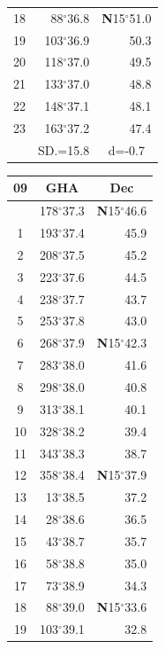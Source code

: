 \documentclass[10pt, a4paper]{report}
\begin{document}
\begin{scriptsize}
\begin{tabular*}{0.2\textwidth}[t]{@{\extracolsep{\fill}}|c|rr|}
18 & 88$^\circ$36.8 & \textbf{N}15$^\circ$51.0\\
19 & 103$^\circ$36.9 & 50.3\\
20 & 118$^\circ$37.0 & 49.5\\
21 & 133$^\circ$37.0 & \raisebox{0.24ex}{\boldmath$\cdot$~\boldmath$\cdot$~~}48.8\\
22 & 148$^\circ$37.1 & 48.1\\
23 & 163$^\circ$37.2 & 47.4\\
\hline
\rule{0pt}{2.4ex} & \multicolumn{1}{c}{SD.=15.8} & \multicolumn{1}{c|}{d=-0.7}\\
\hline
\end{tabular*}\noindent
\begin{tabular*}{0.2\textwidth}[t]{@{\extracolsep{\fill}}|c|rr|}
\hline
\multicolumn{1}{|c|}{\rule{0pt}{2.6ex}\textbf{09}} & \multicolumn{1}{c}{\textbf{GHA}} & \multicolumn{1}{c|}{\textbf{Dec}}\\
\hline\rule{0pt}{2.6ex}\noindent
0 & 178$^\circ$37.3 & \textbf{N}15$^\circ$46.6\\
1 & 193$^\circ$37.4 & 45.9\\
2 & 208$^\circ$37.5 & 45.2\\
3 & 223$^\circ$37.6 & \raisebox{0.24ex}{\boldmath$\cdot$~\boldmath$\cdot$~~}44.5\\
4 & 238$^\circ$37.7 & 43.7\\
5 & 253$^\circ$37.8 & 43.0\\[2Pt]
6 & 268$^\circ$37.9 & \textbf{N}15$^\circ$42.3\\
7 & 283$^\circ$38.0 & 41.6\\
8 & 298$^\circ$38.0 & 40.8\\
9 & 313$^\circ$38.1 & \raisebox{0.24ex}{\boldmath$\cdot$~\boldmath$\cdot$~~}40.1\\
10 & 328$^\circ$38.2 & 39.4\\
11 & 343$^\circ$38.3 & 38.7\\[2Pt]
12 & 358$^\circ$38.4 & \textbf{N}15$^\circ$37.9\\
13 & 13$^\circ$38.5 & 37.2\\
14 & 28$^\circ$38.6 & 36.5\\
15 & 43$^\circ$38.7 & \raisebox{0.24ex}{\boldmath$\cdot$~\boldmath$\cdot$~~}35.7\\
16 & 58$^\circ$38.8 & 35.0\\
17 & 73$^\circ$38.9 & 34.3\\[2Pt]
18 & 88$^\circ$39.0 & \textbf{N}15$^\circ$33.6\\
19 & 103$^\circ$39.1 & 32.8\\

\end{tabular*}
\end{scriptsize}
\end{document}
